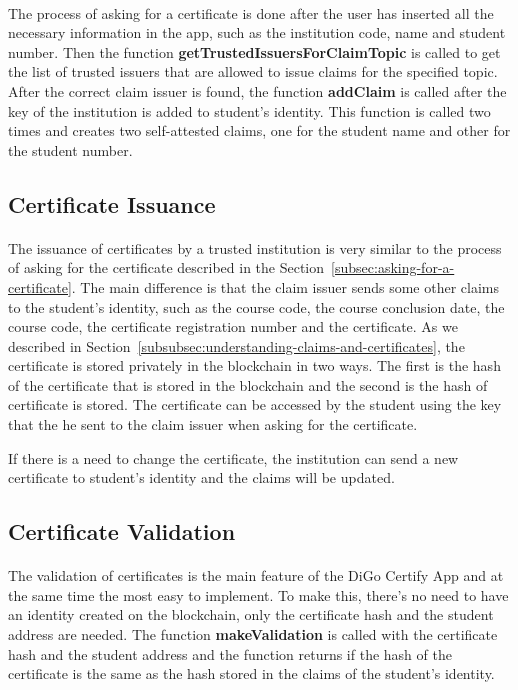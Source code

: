 \paragraph{}

The process of asking for a certificate is done after the user has inserted all the necessary information in the app, such as the institution code, name and student number.
Then the function \textbf{getTrustedIssuersForClaimTopic} is called to get the list of trusted issuers that are allowed to issue claims for the specified topic.
After the correct claim issuer is found, the function \textbf{addClaim} is called after the key of the institution is added to student's identity. This function is called two times
and creates two self-attested claims, one for the student name and other for the student number.

\subsection{Certificate Issuance}\label{subsec:certificate-issuance}
\paragraph{}

The issuance of certificates by a trusted institution is very similar to the process of asking for the certificate described in the Section~\ref{subsec:asking-for-a-certificate}.
The main difference is that the claim issuer sends some other claims to the student's identity, such as the course code, the course conclusion date, the course code, the certificate registration number and the certificate.
As we described in Section~\ref{subsubsec:understanding-claims-and-certificates}, the certificate is stored privately in the blockchain in two ways. The first is the hash of the certificate that is stored in the blockchain and the second is the hash of certificate is stored.
The certificate can be accessed by the student using the key that the he sent to the claim issuer when asking for the certificate.

If there is a need to change the certificate, the institution can send a new certificate to student's identity and the claims will be updated.

\subsection{Certificate Validation}\label{subsec:certificate-verification}
\paragraph{}

The validation of certificates is the main feature of the DiGo Certify App and at the same time the most easy to implement. To make this, there's no need to have an identity created on the blockchain, only the certificate hash and the student address are needed.
The function \textbf{makeValidation} is called with the certificate hash and the student address and the function returns if the hash of the certificate is the same as the hash stored in the claims of the student's identity.
